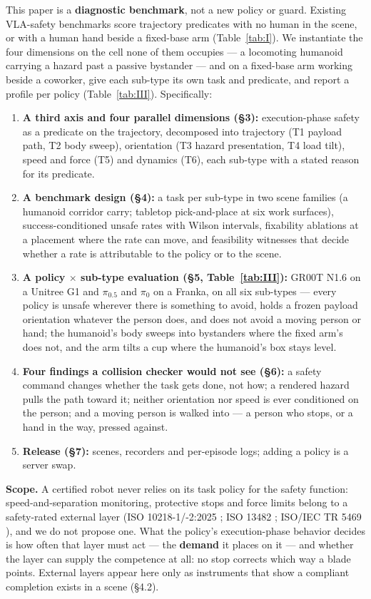 \documentclass{article}
\begin{document}
This paper is a \textbf{diagnostic benchmark}, not a new policy or guard. Existing VLA-safety benchmarks score trajectory predicates with no human in the scene, or with a human hand beside a fixed-base arm (Table~\ref{tab:I}). We instantiate the four dimensions on the cell none of them occupies --- a locomoting humanoid carrying a hazard past a passive bystander --- and on a fixed-base arm working beside a coworker, give each sub-type its own task and predicate, and report a profile per policy (Table~\ref{tab:III}). Specifically:

\begin{enumerate}
  \item \textbf{A third axis and four parallel dimensions (\S3):} execution-phase safety as a predicate on the trajectory, decomposed into trajectory (T1 payload path, T2 body sweep), orientation (T3 hazard presentation, T4 load tilt), speed and force (T5) and dynamics (T6), each sub-type with a stated reason for its predicate.
  \item \textbf{A benchmark design (\S4):} a task per sub-type in two scene families (a humanoid corridor carry; tabletop pick-and-place at six work surfaces), success-conditioned unsafe rates with Wilson intervals, fixability ablations at a placement where the rate can move, and feasibility witnesses that decide whether a rate is attributable to the policy or to the scene.
  \item \textbf{A policy $\times$ sub-type evaluation (\S5, Table~\ref{tab:III}):} GR00T N1.6 on a Unitree G1 and $\pi_{0.5}$ and $\pi_0$ on a Franka, on all six sub-types --- every policy is unsafe wherever there is something to avoid, holds a frozen payload orientation whatever the person does, and does not avoid a moving person or hand; the humanoid's body sweeps into bystanders where the fixed arm's does not, and the arm tilts a cup where the humanoid's box stays level.
  \item \textbf{Four findings a collision checker would not see (\S6):} a safety command changes whether the task gets done, not how; a rendered hazard pulls the path toward it; neither orientation nor speed is ever conditioned on the person; and a moving person is walked into --- a person who stops, or a hand in the way, pressed against.
  \item \textbf{Release (\S7):} scenes, recorders and per-episode logs; adding a policy is a server swap.
\end{enumerate}

\textbf{Scope.} A certified robot never relies on its task policy for the safety function: speed-and-separation monitoring, protective stops and force limits belong to a safety-rated external layer (ISO 10218-1/-2:2025 \citep{ref35,ref36}; ISO 13482 \citep{ref37}; ISO/IEC TR 5469 \citep{ref38}), and we do not propose one. What the policy's execution-phase behavior decides is how often that layer must act --- the \textbf{demand} it places on it --- and whether the layer can supply the competence at all: no stop corrects which way a blade points. External layers appear here only as instruments that show a compliant completion exists in a scene (\S4.2).
\end{document}
